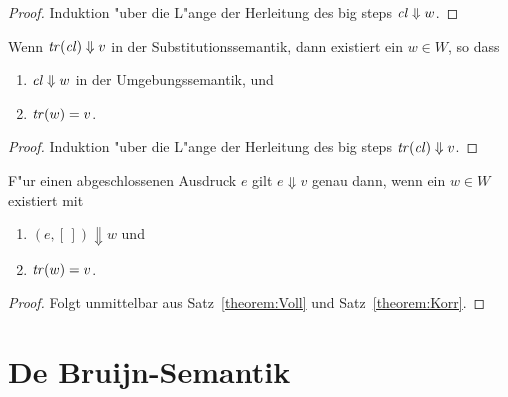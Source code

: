 \documentclass[12pt,fleqn,a4paper]{article}
\newcommand{\cl}{\name{cl}}
\begin{document}
\begin{proof}
  Induktion "uber die L"ange der Herleitung des big steps $\cl \Downarrow w$.
\end{proof}

\begin{theorem} \label{theorem:Voll}
  Wenn $\tr{\cl} \Downarrow v$ in der Substitutionssemantik, dann existiert ein $w \in W$, so dass
  \begin{enumerate}
  \item $\cl \Downarrow w$ in der Umgebungssemantik, und
  \item ${\text{\it tr\/}}(w) = v$.
  \end{enumerate}
\end{theorem}

\begin{proof}
  Induktion "uber die L"ange der Herleitung des big steps $\tr{\cl} \Downarrow v$.
\end{proof}

\begin{corollary}
  F"ur einen abgeschlossenen Ausdruck $e$ gilt $e \Downarrow v$ genau dann, wenn ein $w \in W$ existiert mit
  \begin{enumerate}
  \item $(e,[\,]) \Downarrow w$ und
  \item ${\text{\it tr\/}}(w) = v$.
  \end{enumerate}
\end{corollary}

\begin{proof}
  Folgt unmittelbar aus Satz~\ref{theorem:Voll} und Satz~\ref{theorem:Korr}.
\end{proof}

\section{De Bruijn-Semantik}
\end{document}
